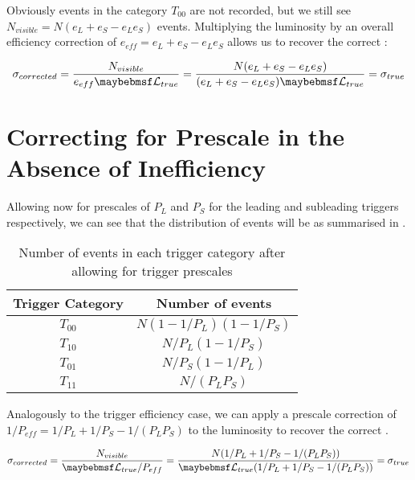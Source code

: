 Obviously events in the category $T_{00}$ are not recorded, but we still see $N_{visible} = N(e_L + e_S - e_L e_S)$ events. Multiplying the luminosity by an overall efficiency correction of $e_{eff} = e_L + e_S - e_L e_S$ allows us to recover the correct \xs:

\begin{equation}
  \sigma_{corrected} = \frac{N_{visible}}{e_{eff} \luminosity_{true}} = \frac{N(e_L + e_S - e_L e_S)}{(e_L + e_S - e_L e_S) \luminosity_{true}} = \sigma_{true}
\end{equation}

\section{Correcting for Prescale in the Absence of Inefficiency}
\label{sec:appendix:prescale_only}
Allowing now for prescales of $P_L$ and $P_S$ for the leading and subleading triggers respectively, we can see that the distribution of events will be as summarised in .

\begin{table}
\begin{center}
  \begin{tabular}{ c c }
    Trigger Category & Number of events      \\
    \midrule
    $T_{00}$         & $N(1-1/P_L)(1-1/P_S)$ \\
    $T_{10}$         & $N/P_L (1-1/P_S)$     \\ 
    $T_{01}$         & $N/P_S (1-1/P_L)$     \\
    $T_{11}$         & $N/(P_L P_S)$          \\       
  \end{tabular}
  \caption{Number of events in each trigger category after allowing for trigger
           prescales}
  \label{tab:appendix:trig_prescales}
\end{center}
\end{table}

Analogously to the trigger efficiency case, we can apply a prescale correction of $1/P_{eff} = 1/P_L + 1/P_S - 1/(P_L P_S)$ to the luminosity to recover the correct \xs. 

\begin{equation}
  \sigma_{corrected} = \frac{N_{visible}}{\luminosity_{true}/P_{eff}} = \frac{N(1/P_L + 1/P_S - 1/(P_L P_S))}{\luminosity_{true} (1/P_L + 1/P_S - 1/(P_L P_S))} = \sigma_{true}
\end{equation}

